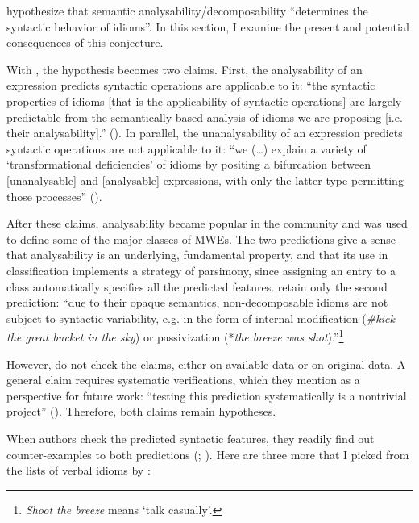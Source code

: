 \documentclass[output=paper]{langsci/langscibook}
\begin{document}
\cite[104]{Gibbs1989} hypothesize that semantic analysability\slash decomposabil\-ity “determines the syntactic behavior of idioms”. In this section, I examine the present and potential consequences of this conjecture.

With \cite{Nunberg1994}, the hypothesis becomes two claims. First, the ana\-lysability of an expression predicts syntactic operations are applicable to it: “the syntactic properties of idioms [that is the applicability of syntactic operations] are largely predictable from the semantically based analysis of idioms we are proposing [i.e. their analysability].” (\citealt[507]{Nunberg1994}). In parallel, the unanalysability of an expression predicts syntactic operations are not applicable to it: “we (\ldots) explain a variety of ‘transformational deficiencies’ of idioms by positing a bifurcation between [unanalysable] and [analysable] expressions, with only the latter type permitting those processes” (\citealt[508]{Nunberg1994}).

After these claims, analysability became popular in the community and was used to define some of the major classes of MWEs. The two predictions give a sense that analysability is an underlying, fundamental property, and that its use in classification implements a strategy of parsimony, since assigning an entry to a class automatically specifies all the predicted features. \cite[4]{Sag:2002}  retain only the second prediction: “due to their opaque semantics, non-decomposable idioms are not subject to syntactic variability, e.g. in the form of internal modification (\textit{\#kick the great bucket in the sky}) or  passivization (*\textit{the breeze was shot}).”\footnote{\textit{Shoot the breeze} means ‘talk casually’.}

However, \cite{Nunberg1994}  do not check the claims, either on available data or on original data. A general claim requires systematic verifications, which they mention as a perspective for future work: “testing this prediction systematically is a nontrivial project” (\citealt[531]{Nunberg1994}). Therefore, both claims remain hypotheses.

When authors check the predicted syntactic features, they readily find out counter-examples to both predictions (\citealt{Abeille95}; \citealt{Stathi2007}). Here are three more that I picked from the lists of  verbal idioms by \citet{gross1982}:
\end{document}
